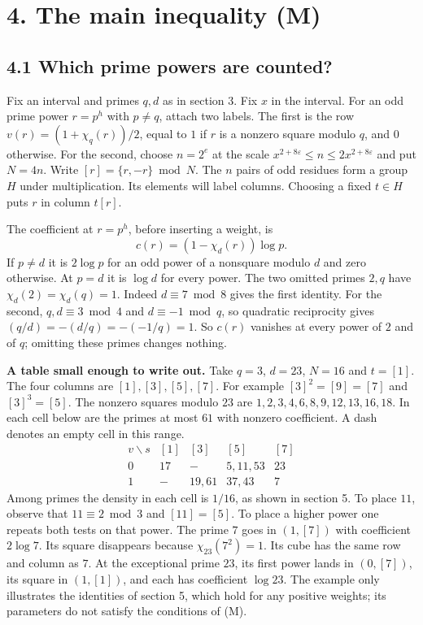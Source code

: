 \documentclass[11pt,letterpaper]{article}
\begin{document}
{\newpage
\section*{4. The main inequality (M)}

\subsection*{4.1 Which prime powers are counted?}

Fix an interval and primes $q,d$ as in section 3. Fix $x$ in the interval. For an odd prime power $r=p^h$ with $p\ne q$, attach two labels. The first is the row $v(r)=(1+\chi_q(r))/2$, equal to $1$ if $r$ is a nonzero square modulo $q$, and $0$ otherwise. For the second, choose $n=2^e$ at the scale $x^{2+8\varepsilon}\le n\le 2x^{2+8\varepsilon}$ and put $N=4n$. Write $[r]=\{r,-r\}\bmod N$. The $n$ pairs of odd residues form a group $H$ under multiplication. Its elements will label columns. Choosing a fixed $t\in H$ puts $r$ in column $t[r]$.

The coefficient at $r=p^h$, before inserting a weight, is
\begin{equation}\label{D:49}
 c(r)=(1-\chi_d(r))\log p.
\end{equation}
If $p\ne d$ it is $2\log p$ for an odd power of a nonsquare modulo $d$ and zero otherwise. At $p=d$ it is $\log d$ for every power. The two omitted primes $2,q$ have $\chi_d(2)=\chi_d(q)=1$. Indeed $d\equiv7\bmod 8$ gives the first identity. For the second, $q,d\equiv3\bmod 4$ and $d\equiv-1\bmod q$, so quadratic reciprocity gives $(q/d)=-(d/q)=-(-1/q)=1$. So $c(r)$ vanishes at every power of $2$ and of $q$; omitting these primes changes nothing.

\textbf{A table small enough to write out.} Take $q=3$, $d=23$, $N=16$ and $t=[1]$. The four columns are $[1],[3],[5],[7]$. For example $[3]^2=[9]=[7]$ and $[3]^3=[5]$. The nonzero squares modulo $23$ are $1,2,3,4,6,8,9,12,13,16,18$. In each cell below are the primes at most $61$ with nonzero coefficient. A dash denotes an empty cell in this range.
\begin{equation}\label{D:50}
 \begin{array}{c|cccc}
 v\backslash s &[1]&[3]&[5]&[7]\\ \hline
 0&17& - &5,11,53&23\\
 1& -&19,61&37,43&7
 \end{array}
\end{equation}
Among primes the density in each cell is $1/16$, as shown in section 5. To place $11$, observe that $11\equiv2\bmod3$ and $[11]=[5]$. To place a higher power one repeats both tests on that power. The prime $7$ goes in $(1,[7])$ with coefficient $2\log 7$. Its square disappears because $\chi_{23}(7^2)=1$. Its cube has the same row and column as $7$. At the exceptional prime $23$, its first power lands in $(0,[7])$, its square in $(1,[1])$, and each has coefficient $\log 23$. The example only illustrates the identities of section 5, which hold for any positive weights; its parameters do not satisfy the conditions of (M).

}
\end{document}
